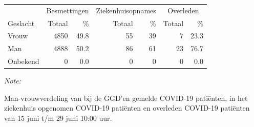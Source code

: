 \documentclass[
  english,
  man,floatsintext]{apa6}
\begin{document}
\begin{table}
\centering\begingroup\fontsize{11}{13}\selectfont

\begin{threeparttable}
\begin{tabular}{lrrrrrr}
\toprule
\multicolumn{1}{c}{ } & \multicolumn{2}{c}{Besmettingen} & \multicolumn{2}{c}{Ziekenhuisopnames} & \multicolumn{2}{c}{Overleden} \\
\cmidrule(l{3pt}r{3pt}){2-3} \cmidrule(l{3pt}r{3pt}){4-5} \cmidrule(l{3pt}r{3pt}){6-7}
Geslacht & Totaal & \% & Totaal & \% & Totaal & \%\\
\midrule
Vrouw & 4850 & 49.8 & 55 & 39 & 7 & 23.3\\
Man & 4888 & 50.2 & 86 & 61 & 23 & 76.7\\
Onbekend & 0 & 0.0 & 0 & 0 & 0 & 0.0\\
\bottomrule
\end{tabular}
\begin{tablenotes}
\item \textit{Note: } 
\item Man-vrouwverdeling van bij de GGD’en gemelde COVID-19 patiënten, in het ziekenhuis opgenomen COVID-19 patiënten en overleden COVID-19 patiënten van 15 juni t/m 29 juni 10:00 uur.
\end{tablenotes}
\end{threeparttable}
\endgroup{}
\end{table}
\newpage
\end{document}
